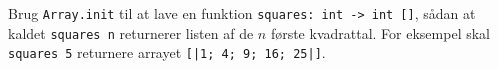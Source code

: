 Brug \lstinline{Array.init} til at lave en funktion \lstinline{squares: int -> int []}, sådan at kaldet \lstinline{squares n} returnerer listen af de $n$ første kvadrattal.  For eksempel skal \lstinline{squares 5} returnere arrayet \lstinline{[|1; 4; 9; 16; 25|]}.
